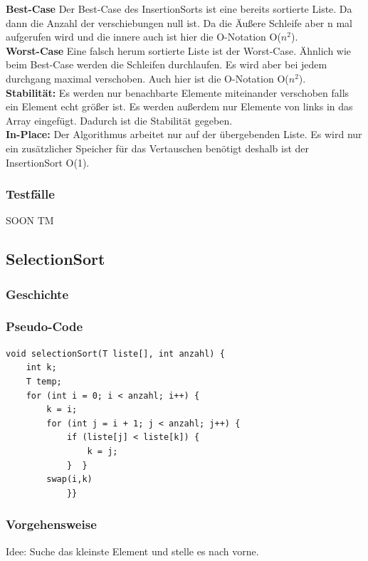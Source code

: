 \documentclass{article}
\begin{document}
\textbf{Best-Case} Der Best-Case des InsertionSorts ist eine bereits sortierte Liste. Da dann die Anzahl der verschiebungen null ist. Da die Äußere Schleife aber n mal aufgerufen wird und die innere auch ist hier die O-Notation O($n^{2}$). \\
\textbf{Worst-Case} Eine falsch herum sortierte Liste ist der Worst-Case. Ähnlich wie beim Best-Case werden die Schleifen durchlaufen. Es wird aber bei jedem durchgang maximal verschoben. Auch hier ist die O-Notation O($n^{2}$).\\
\textbf{Stabilität:}  Es werden nur benachbarte Elemente miteinander verschoben falls ein Element echt größer ist. Es werden außerdem nur Elemente von links in das Array eingefügt. Dadurch ist die Stabilität gegeben.\\

\textbf{In-Place:}  Der Algorithmus arbeitet nur auf der übergebenden Liste. Es wird nur ein zusätzlicher Speicher für das Vertauschen benötigt deshalb ist der InsertionSort O(1).\\


\subsubsection{Testfälle}
SOON TM
\subsection{SelectionSort}
\subsubsection{Geschichte}
\subsubsection{Pseudo-Code}
\begin{lstlisting}
void selectionSort(T liste[], int anzahl) {
    int k;
    T temp;
    for (int i = 0; i < anzahl; i++) {
        k = i;
        for (int j = i + 1; j < anzahl; j++) {
            if (liste[j] < liste[k]) {
                k = j;
            }  }
        swap(i,k)
            }}
\end{lstlisting}
\subsubsection{Vorgehensweise}
Idee: Suche das kleinste Element und stelle es nach vorne. \\
\end{document}
